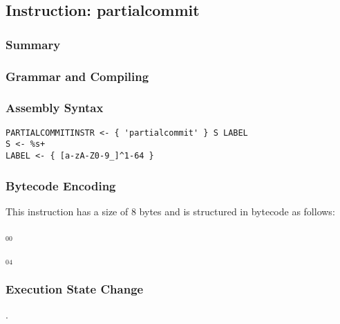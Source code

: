 \subsection{Instruction: partialcommit}

\subsubsection{Summary}


\subsubsection{Grammar and Compiling}


\subsubsection{Assembly Syntax}

\begin{myquote}
\begin{verbatim}
PARTIALCOMMITINSTR <- { 'partialcommit' } S LABEL
S <- %s+
LABEL <- { [a-zA-Z0-9_]^1-64 }
\end{verbatim}
\end{myquote}


\subsubsection{Bytecode Encoding}

This instruction has a size of 8 bytes and is structured in bytecode as follows:

$_{00}$\ 



$_{04}$\ 


\subsubsection{Execution State Change}

.


